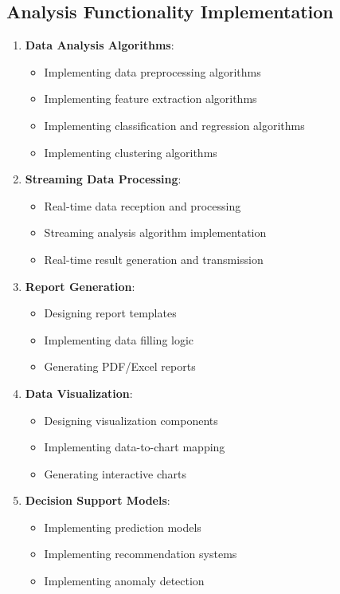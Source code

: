 \documentclass[a4paper,12pt]{article}
\begin{document}
\subsection{Analysis Functionality Implementation}

\begin{enumerate}
  \item \textbf{Data Analysis Algorithms}:
    \begin{itemize}
      \item Implementing data preprocessing algorithms
      \item Implementing feature extraction algorithms
      \item Implementing classification and regression algorithms
      \item Implementing clustering algorithms
    \end{itemize}
  
  \item \textbf{Streaming Data Processing}:
    \begin{itemize}
      \item Real-time data reception and processing
      \item Streaming analysis algorithm implementation
      \item Real-time result generation and transmission
    \end{itemize}
  
  \item \textbf{Report Generation}:
    \begin{itemize}
      \item Designing report templates
      \item Implementing data filling logic
      \item Generating PDF/Excel reports
    \end{itemize}
  
  \item \textbf{Data Visualization}:
    \begin{itemize}
      \item Designing visualization components
      \item Implementing data-to-chart mapping
      \item Generating interactive charts
    \end{itemize}
  
  \item \textbf{Decision Support Models}:
    \begin{itemize}
      \item Implementing prediction models
      \item Implementing recommendation systems
      \item Implementing anomaly detection
    \end{itemize}
  

\end{enumerate}
\end{document}
